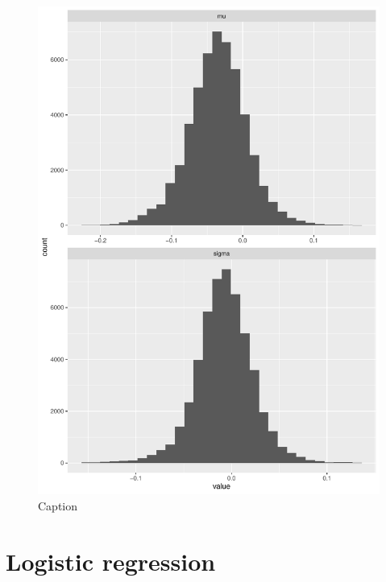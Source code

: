 \begin{figure}[H]
    \centering
    \includegraphics[scale = 0.7, page = 6]{figures/test.pdf}
    \caption{Caption}
    \label{fig:my_label}
\end{figure}{}
\section{Logistic regression}\label{sec:log_reg_experiments}







